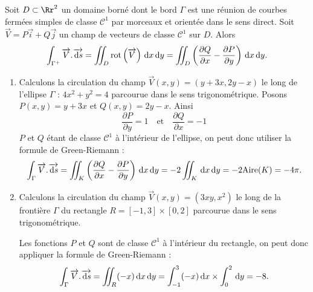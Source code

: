 \documentclass[class=report,crop=false]{standalone}
\begin{document}

\begin{theoreme} Soit $D\subset \Rr^2$ un domaine borné dont le bord $\Gamma $ est une réunion de courbes fermées simples de classe ${\mathscr C}^1$ par morceaux et orientée dans le sens direct. Soit $\overrightarrow{V}=P\vec i+Q\vec j$ un champ de vecteurs de classe ${\mathscr C}^1$ sur $D$. Alors
$$\int _{\Gamma ^+}\overrightarrow{V}.\overrightarrow{\d s}=\int \!\!\!\!\int _D\Rrot \left(\overrightarrow{V}\right)\d x\d y=\int \!\!\!\!\int _D\left(\frac{\partial Q}{\partial x}-\frac{\partial P}{\partial y}\right)\d x\d y.$$
\end{theoreme}

\vskip4mm

\begin{enumerate}
\item Calculons la circulation du champ $\overrightarrow{V}(x,y)=(y+3x,2y-x)$ le long de l'ellipse $\Gamma$ : $4x^2+y^2=4$ parcourue dans le sens trigonométrique. Posons $P(x,y)= y+3x$ et $Q(x,y)=2y-x$. Ainsi 
$$\frac{\partial P}{\partial y}=1\quad \mbox{et}\quad \frac{\partial Q}{\partial x}=-1$$
$P$ et $Q$ étant de classe ${\mathscr C}^1$ à l'intérieur de l'ellipse, on peut donc utiliser la formule de Green-Riemann :
$$\int _{\Gamma}\overrightarrow{V}.\overrightarrow{\d s}=\int \!\!\!\!\int _K\left(\frac{\partial Q}{\partial x}-\frac{\partial P}{\partial y}\right)\d x\d y=-2\int \!\!\!\!\int _K\d x\d y=-2\mbox{Aire}(K)=-4\pi.$$
\item Calculons la circulation du champ $\overrightarrow{V}(x,y)=(3xy,x^2)$ le long de la frontière $\Gamma $ du rectangle $R=[-1,3]\times [0,2]$ parcourue dans le sens trigonométrique.

\vskip2mm

\noindent Les fonctions $P$ et $Q$ sont de classe ${\mathscr C}^1$ à l'intérieur du rectangle, on peut donc appliquer la formule de Green-Riemann :
$$\int _{\Gamma}\overrightarrow{V}.\overrightarrow{\,\mathrm{d} s}=\int \!\!\!\!\int _R(-x)\,\mathrm{d} x\,\mathrm{d} y=\int _{-1}^3(-x)\,\mathrm{d} x\times \int _0^2\,\mathrm{d} y=-8.$$
\end{enumerate}
\end{document}

